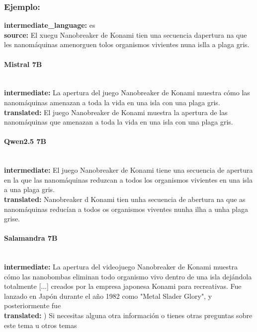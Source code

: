 \subsubsection{Ejemplo:}
\textbf{intermediate\_language:} es\\
\textbf{source:} El xuegu Nanobreaker de Konami tien una secuencia d\textquotesingle{}apertura na que les nanomáquinas amenorguen tolos organismos vivientes nuna islla a plaga gris.

\paragraph{Mistral 7B}~\\
\textbf{intermediate:} La apertura del juego Nanobreaker de Konami muestra cómo las nanomáquinas amenazan a toda la vida en una isla con una plaga gris.\\
\textbf{translated:} El juego Nanobreaker de Konami muestra la apertura de las nanomáquinas que amenazan a toda la vida en una isla con una plaga gris.

\paragraph{Qwen2.5 7B}~\\
\textbf{intermediate:} El juego Nanobreaker de Konami tiene una secuencia de apertura en la que las nanomáquinas reduzcan a todos los organismos vivientes en una isla a una plaga gris.\\
\textbf{translated:} Nanobreaker d Konami tien unha secuencia de abertura na que as nanomáquinas reducían a todos os organismos viventes nunha ilha a unha plaga grise.

\paragraph{Salamandra 7B}~\\
\textbf{intermediate:} La apertura del videojuego Nanobreaker de Konami muestra cómo las nanobombas eliminan todo organismo vivo dentro de una isla dejándola totalmente  [...]  creados por la empresa japonesa Konami para recreativas. Fue lanzado en Japón durante el año 1982 como "Metal Slader Glory", y posteriormente fue\\
\textbf{translated:} )       Si necesitas alguna otra información o tienes otras preguntas sobre este tema u otros temas

